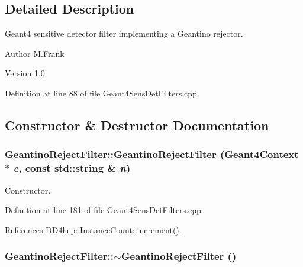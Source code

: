 \subsection{Detailed Description}
Geant4 sensitive detector filter implementing a Geantino rejector. \begin{DoxyAuthor}{Author}
M.Frank 
\end{DoxyAuthor}
\begin{DoxyVersion}{Version}
1.0 
\end{DoxyVersion}


Definition at line 88 of file Geant4SensDetFilters.cpp.

\subsection{Constructor \& Destructor Documentation}
\hypertarget{struct_d_d4hep_1_1_simulation_1_1_geantino_reject_filter_a1c59ff0c23002a3c6325c3ba74c92f35}{
\subsubsection[{GeantinoRejectFilter}]{\setlength{\rightskip}{0pt plus 5cm}GeantinoRejectFilter::GeantinoRejectFilter ({\bf Geant4Context} $\ast$ {\em c}, \/  const std::string \& {\em n})}}
\label{struct_d_d4hep_1_1_simulation_1_1_geantino_reject_filter_a1c59ff0c23002a3c6325c3ba74c92f35}


Constructor. 

Definition at line 181 of file Geant4SensDetFilters.cpp.

References DD4hep::InstanceCount::increment().\hypertarget{struct_d_d4hep_1_1_simulation_1_1_geantino_reject_filter_a566d0c7a2368a3358c321279be8ac3ae}{
\subsubsection[{$\sim$GeantinoRejectFilter}]{\setlength{\rightskip}{0pt plus 5cm}GeantinoRejectFilter::$\sim$GeantinoRejectFilter ()}}
\label{struct_d_d4hep_1_1_simulation_1_1_geantino_reject_filter_a566d0c7a2368a3358c321279be8ac3ae}



